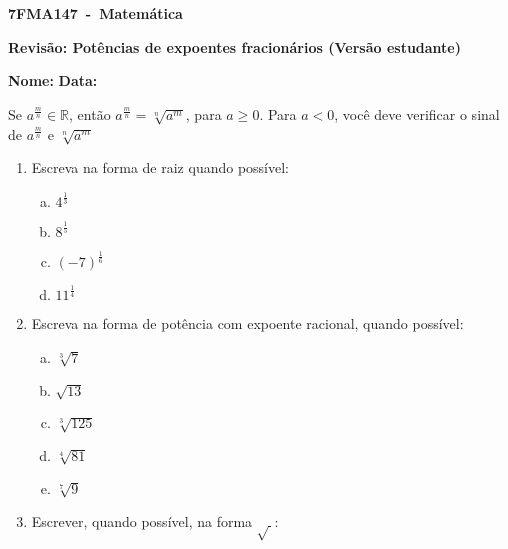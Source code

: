 \documentclass[a4paper,14pt]{article}
\begin{document}
	
	\noindent\textbf{7FMA147~-~Matemática} 
	
	\begin{center}
		\textbf{Revisão: Potências de expoentes fracionários (Versão estudante)}
	\end{center}
	
	
	\noindent\textbf{Nome:} \underline{\hspace{10cm}}
    \noindent\textbf{Data:} \underline{\hspace{4cm}}
	
	
	\begin{multicols}{2}
		Se $a^\frac{m}{n} \in \mathbb{R}$, então $a^\frac{m}{n} = \sqrt[n]{a^m}$, para $a \geq 0$. Para $a < 0$, você deve verificar o sinal de $a^\frac{m}{n}$ e $\sqrt[n]{a^m}$
	\begin{enumerate}	
		\item Escreva na forma de raiz quando possível:
		\begin{enumerate}[a)]
			\item $4^\frac{1}{3}$ \\
			\item $8^\frac{1}{5}$ \\
			\item $(-7)^\frac{1}{6}$ \\
			\item $11^\frac{1}{4}$ \\
	    \end{enumerate}
        \item Escreva na forma de potência com expoente racional, quando possível:
        \begin{enumerate}[a)]
        	\item $\sqrt[3]{7}$ \\
        	\item $\sqrt{13}$ \\
        	\item $\sqrt[3]{125}$ \\
        	\item $\sqrt[4]{81}$ \\
        	\item $\sqrt[7]{9}$ \\
        \end{enumerate}
        \item Escrever, quando possível, na forma $\sqrt{~}$:

\end{enumerate}
\end{multicols}
\end{document}
